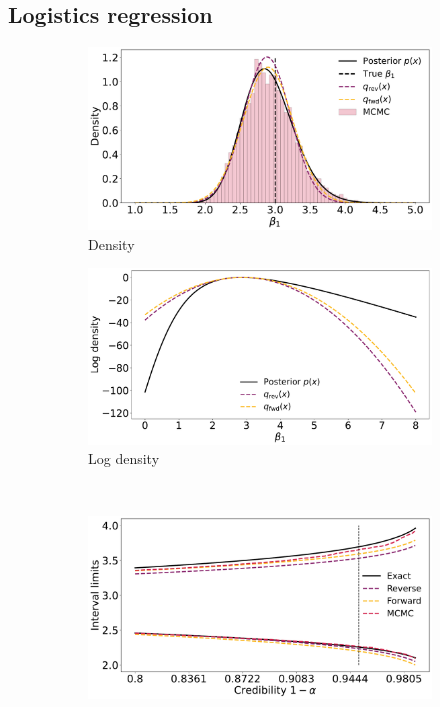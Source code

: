 \subsection{Logistics regression} \label{subsec:logreg}

\begin{figure}[ht]
    \begin{subfigure}{0.475\linewidth}
    \centering
    \includegraphics[width=\linewidth]{fig/logreg_q.pdf}
    \caption{Density}
    \label{fig:logreg_p}
    \end{subfigure}%
    \begin{subfigure}{0.475\linewidth}
        \centering
        \includegraphics[width=\linewidth]{fig/logreg_logq.pdf}
        \caption{Log density}
        \label{fig:logreg_lp}
        \end{subfigure}\\[1ex]
    \begin{subfigure}{\linewidth}
    \centering
    \includegraphics[width=0.8\linewidth]{fig/logreg_cilims.pdf}

\end{subfigure}
\end{figure}
